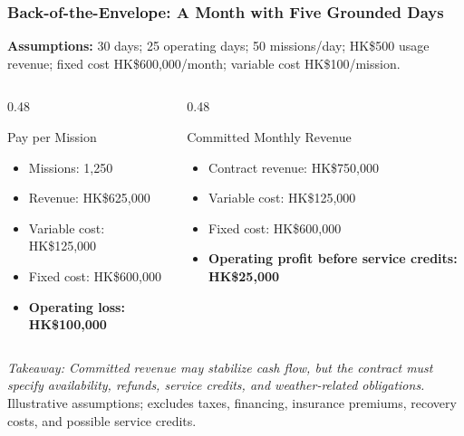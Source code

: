 \documentclass{beamer}
\begin{document}
\begin{frame}[t,shrink=15]
  \frametitle{Back-of-the-Envelope: A Month with Five Grounded Days}
  \textbf{Assumptions:} 30 days; 25 operating days; 50 missions/day; HK\$500 usage revenue; fixed cost HK\$600,000/month; variable cost HK\$100/mission.
  \begin{columns}[T]
    \begin{column}{0.48\textwidth}
      \begin{block}{Pay per Mission}
      \begin{itemize}
        \item Missions: 1,250
        \item Revenue: HK\$625,000
        \item Variable cost: HK\$125,000
        \item Fixed cost: HK\$600,000
        \item \textbf{Operating loss: HK\$100,000}
      \end{itemize}
      \end{block}
    \end{column}
    \begin{column}{0.48\textwidth}
      \begin{block}{Committed Monthly Revenue}
      \begin{itemize}
        \item Contract revenue: HK\$750,000
        \item Variable cost: HK\$125,000
        \item Fixed cost: HK\$600,000
        \item \textbf{Operating profit before service credits: HK\$25,000}
      \end{itemize}
      \end{block}
    \end{column}
  \end{columns}
  \textit{Takeaway: Committed revenue may stabilize cash flow, but the contract must specify availability, refunds, service credits, and weather-related obligations.}
  \vfill
  {\tiny Illustrative assumptions; excludes taxes, financing, insurance premiums, recovery costs, and possible service credits.}
\end{frame}
\end{document}
